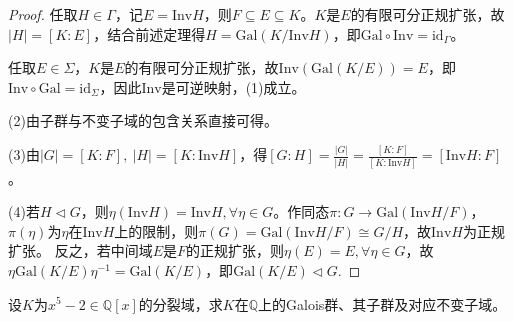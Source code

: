 \documentclass[../../main.tex]{subfiles}%
\begin{document}
\begin{proof}

任取$H\in\Gamma$，记$E=\mathrm{Inv}H$，则$F\subseteq E\subseteq K$。$K$是$E$的有限可分正规扩张，故$|H|=[K:E]$，结合前述定理得$H=\mathrm{Gal}(K/\mathrm{Inv}H)$，即$\mathrm{Gal}\circ\mathrm{Inv}=\mathrm{id}_\Gamma$。

任取$E\in\Sigma$，$K$是$E$的有限可分正规扩张，故$\mathrm{Inv}(\mathrm{Gal}(K/E))=E$，即$\mathrm{Inv}\circ\mathrm{Gal}=\mathrm{id}_\Sigma$，因此$\mathrm{Inv}$是可逆映射，(1)成立。

(2)由子群与不变子域的包含关系直接可得。

(3)由$|G|=[K:F],\ |H|=[K:\mathrm{Inv}H]$，得$[G:H]=\frac{|G|}{|H|}=\frac{[K:F]}{[K:\mathrm{Inv}H]}=[\mathrm{Inv}H:F]$。

(4)若$H\lhd G$，则$\eta(\mathrm{Inv}H)=\mathrm{Inv}H,\forall\eta\in G$。作同态$\pi:G\to\mathrm{Gal}(\mathrm{Inv}H/F)$，$\pi(\eta)$为$\eta$在$\mathrm{Inv}H$上的限制，则$\pi(G)=\mathrm{Gal}(\mathrm{Inv}H/F)\cong G/H$，故$\mathrm{Inv}H$为正规扩张。
反之，若中间域$E$是$F$的正规扩张，则$\eta(E)=E,\forall\eta\in G$，故$\eta\mathrm{Gal}(K/E)\eta^{-1}=\mathrm{Gal}(K/E)$，即$\mathrm{Gal}(K/E)\lhd G$.

\end{proof}

\begin{example}
设$K$为$x^5-2\in\mathbb{Q}[x]$的分裂域，求$K$在$\mathbb{Q}$上的Galois群、其子群及对应不变子域。
\end{example}
\end{document}
